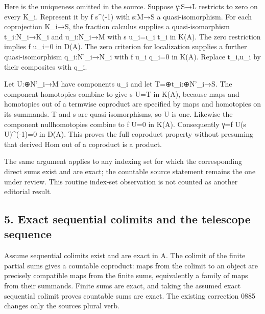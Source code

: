 Here is the uniqueness omitted in the source. Suppose γ:\allowbreak{}S\allowbreak{}→L restricts to zero on every K\_\allowbreak{}i. Represent it by f s\textasciicircum{}(-1)\allowbreak{} with s:\allowbreak{}M\allowbreak{}→S a quasi-isomorphism. For each coprojection K\_\allowbreak{}i\allowbreak{}→S,\allowbreak{} the fraction calculus supplies a quasi-isomorphism t\_\allowbreak{}i:\allowbreak{}N\_\allowbreak{}i\allowbreak{}→K\_\allowbreak{}i and u\_\allowbreak{}i:\allowbreak{}N\_\allowbreak{}i\allowbreak{}→M with s u\_\allowbreak{}i\allowbreak{}=ι\_\allowbreak{}i t\_\allowbreak{}i in K(A)\allowbreak{}. The zero restriction implies f u\_\allowbreak{}i\allowbreak{}=0 in D(A)\allowbreak{}. The zero criterion for localization supplies a further quasi-isomorphism q\_\allowbreak{}i:\allowbreak{}N'\_\allowbreak{}i\allowbreak{}→N\_\allowbreak{}i with f u\_\allowbreak{}i q\_\allowbreak{}i\allowbreak{}=0 in K(A)\allowbreak{}. Replace t\_\allowbreak{}i,\allowbreak{}u\_\allowbreak{}i by their composites with q\_\allowbreak{}i.

Let U:\allowbreak{}\allowbreak{}⊕N'\_\allowbreak{}i\allowbreak{}→M have components u\_\allowbreak{}i and let T\allowbreak{}=\allowbreak{}⊕t\_\allowbreak{}i:\allowbreak{}\allowbreak{}⊕N'\_\allowbreak{}i\allowbreak{}→S. The component homotopies combine to give s U\allowbreak{}=T in K(A)\allowbreak{},\allowbreak{} because maps and homotopies out of a termwise coproduct are specified by maps and homotopies on its summands. T and s are quasi-isomorphisms,\allowbreak{} so U is one. Likewise the component nullhomotopies combine to f U\allowbreak{}=0 in K(A)\allowbreak{}. Consequently γ\allowbreak{}=f U(s U)\allowbreak{}\textasciicircum{}(-1)\allowbreak{}\allowbreak{}=0 in D(A)\allowbreak{}. This proves the full coproduct property without presuming that derived Hom out of a coproduct is a product.

The same argument applies to any indexing set for which the corresponding direct sums exist and are exact; the countable source statement remains the one under review. This routine index-set observation is not counted as another editorial result.

\subsection{5. Exact sequential colimits and the telescope sequence}\label{proofs-10139-10427-exact-sequential-colimits-and-the-telescope-sequence}

Assume sequential colimits exist and are exact in A. The colimit of the finite partial sums gives a countable coproduct:\allowbreak{} maps from the colimit to an object are precisely compatible maps from the finite sums,\allowbreak{} equivalently a family of maps from their summands. Finite sums are exact,\allowbreak{} and taking the assumed exact sequential colimit proves countable sums are exact. The existing correction 0885 changes only the source\textquotesingle s plural verb.

